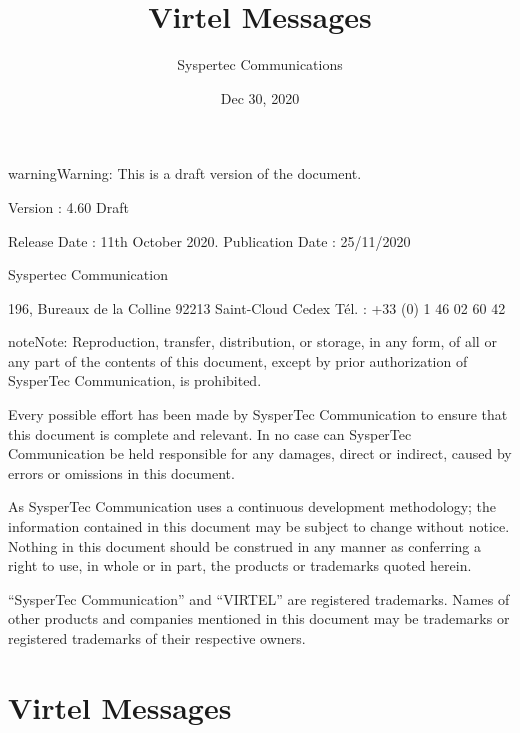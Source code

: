 \documentclass[letterpaper,10pt,english]{sphinxmanual}
\title{Virtel Messages}
\date{Dec 30, 2020}
\author{Syspertec Communications}
\begin{document}
\pagestyle{empty}
\sphinxmaketitle
\pagestyle{plain}
\sphinxtableofcontents
\pagestyle{normal}
\label{\detokenize{messages::doc}}




\begin{sphinxadmonition}{warning}{Warning:}
This is a draft version of the document.
\end{sphinxadmonition}

Version : 4.60 Draft

Release Date : 11th October 2020. Publication Date : 25/11/2020

Syspertec Communication

196, Bureaux de la Colline 92213 Saint-Cloud Cedex Tél. : +33 (0) 1 46 02 60 42


\begin{sphinxadmonition}{note}{Note:}
Reproduction, transfer, distribution, or storage, in any form, of all or any part of
the contents of this document, except by prior authorization of SysperTec
Communication, is prohibited.

Every possible effort has been made by SysperTec Communication to ensure that this document
is complete and relevant. In no case can SysperTec Communication be held responsible for
any damages, direct or indirect, caused by errors or omissions in this document.

As SysperTec Communication uses a continuous development methodology; the information
contained in this document may be subject to change without notice. Nothing in this
document should be construed in any manner as conferring a right to use, in whole or in
part, the products or trademarks quoted herein.

“SysperTec Communication” and “VIRTEL” are registered trademarks. Names of other products
and companies mentioned in this document may be trademarks or registered trademarks of
their respective owners.
\end{sphinxadmonition}


\chapter{Virtel Messages}
\label{\detokenize{messages:virtel-messages}}\label{\detokenize{messages:v460mg-introduction}}
\end{document}
